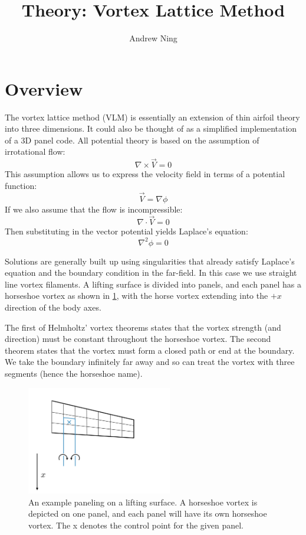 \documentclass{article}
\begin{document}
\author{Andrew Ning}
\title{Theory: Vortex Lattice Method}
\maketitle

\section{Overview}

The vortex lattice method (VLM) is essentially an extension of thin airfoil theory into three dimensions.  It could also be thought of as a simplified implementation of a 3D panel code.  All potential theory is based on the assumption of irrotational flow: 
\begin{equation}
\nabla \times \vec{V} = 0
\end{equation}
This assumption allows us to express the velocity field in terms of a potential function:
\begin{equation}
\vec{V} = \nabla \phi
\end{equation}
If we also assume that the flow is incompressible:
\begin{equation}
\nabla \cdot \vec V = 0
\end{equation}
Then substituting in the vector potential yields Laplace's equation:
\begin{equation}
\nabla^2 \phi = 0
\end{equation}

Solutions are generally built up using singularities that already satisfy Laplace's equation and the boundary condition in the far-field.  In this case we use straight line vortex filaments.  A lifting surface is divided into panels, and each panel has a horseshoe vortex as shown in \cref{fig:horseshoe}, with the horse vortex extending into the $+x$ direction of the body axes.  

The first of Helmholtz' vortex theorems states that the vortex strength (and direction) must be constant throughout the horseshoe vortex.  The second theorem states that the vortex must form a closed path or end at the boundary.  We take the boundary infinitely far away and so can treat the vortex with three segments (hence the horseshoe name).  

\begin{figure}[htbp]
\centering
\includegraphics[width=2.5in]{figs/horseshoe}
\caption{An example paneling on a lifting surface. A horseshoe vortex is depicted on one panel, and each panel will have its own horseshoe vortex.  The x denotes the control point for the given panel.}
\label{fig:horseshoe}
\end{figure}
\end{document}
